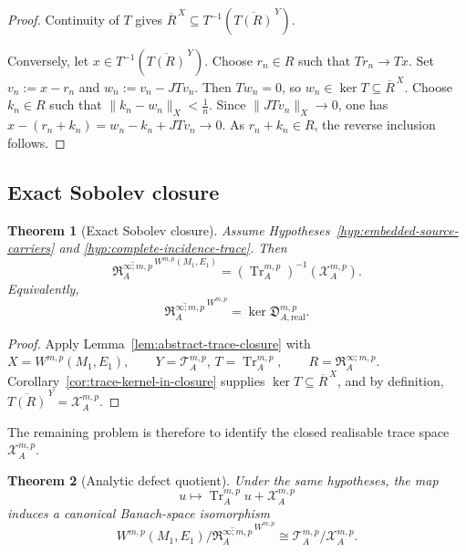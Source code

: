 \documentclass[11pt]{article}
\theoremstyle{plain}
\newtheorem{theorem}{Theorem}[section]
\theoremstyle{definition}
\begin{document}
\begin{proof}
Continuity of \(T\) gives
\(\overline R^{\,X} \subseteq T^{-1} \left( \overline{T(R)}^{\,Y} \right)\).

Conversely, let
\(x\in T^{-1} \left( \overline{T(R)}^{\,Y} \right)\).
Choose \(r_n\in R\) such that
\(T r_n\longrightarrow Tx\).
Set \(v_n:=x-r_n\) and
\(w_n:=v_n-J T v_n\).
Then
\(T w_n=0\),
so
\(w_n\in\ker T \subseteq \overline R^{\,X}\).
Choose \(k_n\in R\) such that
\(\|k_n-w_n\|_X<\frac1n\).
Since
\(\|J T v_n\|_X\longrightarrow0\),
one has
\(x-(r_n+k_n) = w_n-k_n+J T v_n \longrightarrow0\).
As \(r_n+k_n\in R\), the reverse inclusion follows.
\end{proof}



\subsection{Exact Sobolev closure}
\label{subsec:exact-sobolev-closure}

\begin{theorem}[Exact Sobolev closure]
\label{thm:exact-sobolev-closure}
Assume
Hypotheses~\ref{hyp:embedded-source-carriers}
and \ref{hyp:complete-incidence-trace}. Then
\[
  \boxed{
  \overline{
    \mathfrak R_A^{\infty;m,p}
  }^{\,W^{m,p}(M_1,E_1)}
  =
  \left(
    \operatorname{Tr}_A^{m,p}
  \right)^{-1}
  \left(
    \mathcal X_A^{m,p}
  \right).
  }
\]
Equivalently,
\[
  \overline{
    \mathfrak R_A^{\infty;m,p}
  }^{\,W^{m,p}}
  =
  \ker
  \mathfrak D_{A,\mathrm{real}}^{m,p}.
\]
\end{theorem}

\begin{proof}
Apply
Lemma~\ref{lem:abstract-trace-closure}
with
\(X=W^{m,p}(M_1,E_1), \qquad Y=\mathcal T_A^{m,p}\),
\(T=\operatorname{Tr}_A^{m,p}, \qquad R=\mathfrak R_A^{\infty;m,p}\).
Corollary~\ref{cor:trace-kernel-in-closure}
supplies
\(\ker T\subseteq\overline R^{\,X}\),
and by definition,
\(\overline{T(R)}^{\,Y} = \mathcal X_A^{m,p}\).
\end{proof}

The remaining problem is therefore to identify the closed realisable trace space \(\mathcal X_A^{m,p}\).

\begin{theorem}[Analytic defect quotient]
\label{thm:analytic-defect-quotient}
Under the same hypotheses, the map
\[
  u
  \longmapsto
  \operatorname{Tr}_A^{m,p}u
  +
  \mathcal X_A^{m,p}
\]
induces a canonical Banach-space isomorphism
\[
  W^{m,p}(M_1,E_1)
  \Big/
  \overline{
    \mathfrak R_A^{\infty;m,p}
  }^{\,W^{m,p}}
  \cong
  \mathcal T_A^{m,p}/\mathcal X_A^{m,p}.
\]
\end{theorem}
\end{document}
